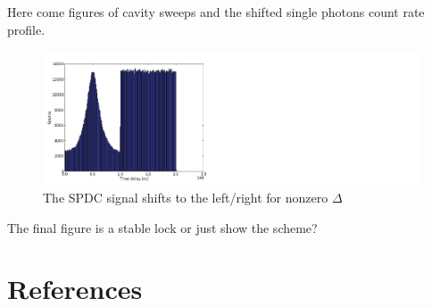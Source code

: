 \documentclass[aps,pra,showpacs,reprint,onecolumn,notitlepage]{revtex4-1}
\begin{document}
Here come figures of cavity sweeps and the shifted single photons count rate profile. 

\begin{figure}[htb]
  \centering
  \includegraphics[scale=0.8]{pictures/exp_WGMR_detuning/SPDC_frequ_sweep.pdf} 
\caption{The SPDC signal shifts to the left/right for nonzero $\Delta$}
	\label{lockingsignal}
\end{figure}


The final figure is a stable lock or just show the scheme?

\section{References}
	
	
%	

%
\end{document}

